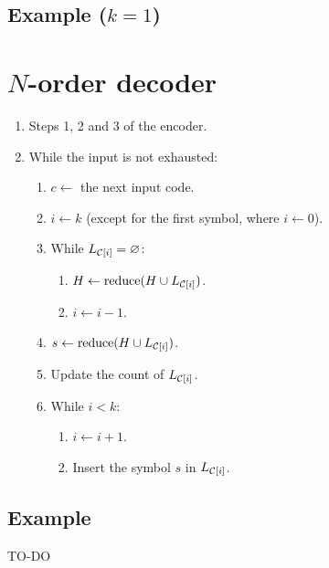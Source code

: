 \subsection{Example ($k=1$)}

\section{$N$-order decoder}
\begin{enumerate}
\def\labelenumi{\arabic{enumi}.}
\tightlist
\item
  Steps 1, 2 and 3 of the encoder.
\item
  While the input is not exhausted:
  \begin{enumerate}
  \def\labelenumii{\arabic{enumii}.}
  \tightlist
  \item
    \(c\leftarrow\) the next input code.
  \item
    \(i\leftarrow k\) (except for the first symbol, where
    \(i\leftarrow 0\)).
  \item
    While \(L_{{\cal C}[i]}=\varnothing\):
    \begin{enumerate}
    \def\labelenumiii{\arabic{enumiii}.}
    \tightlist
    \item
      \(H\leftarrow \text{reduce}(H\cup L_{{\cal C}[i]})\).
    \item
      \(i\leftarrow i-1\).
    \end{enumerate}
  \item
    \(s\leftarrow \text{reduce}(H\cup L_{{\cal C}[i]})\).
  \item
    Update the count of \(L_{{\cal C}[i]}\).
  \item
    While \(i<k\):
    \begin{enumerate}
    \def\labelenumiii{\arabic{enumiii}.}
    \tightlist
    \item
      \(i\leftarrow i+1\).
    \item
      Insert the symbol \(s\) in \(L_{{\cal C}[i]}\).
    \end{enumerate}
  \end{enumerate}
\end{enumerate}

\subsection{Example}
TO-DO

